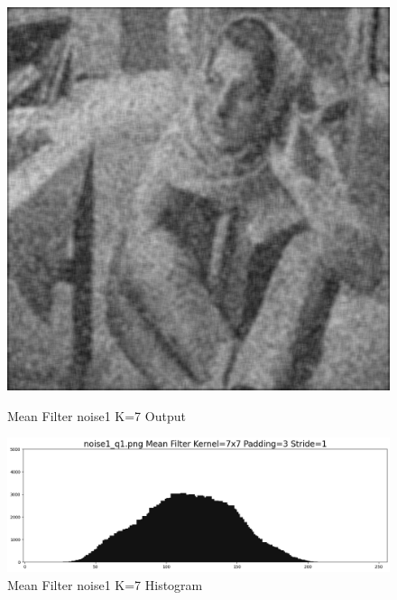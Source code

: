 \documentclass[12pt,a4paper]{report}
\begin{document}
\begin{figure}[!htb]
  \includegraphics[width=1\linewidth]{output/noise1_q1_K7P3.png}
  \caption{Mean Filter noise1 K=7 Output}
  \includegraphics[width=1\linewidth]{output/noise1_q1_K7P3_his.png}
  \caption{Mean Filter noise1 K=7 Histogram}
\end{figure}
\end{document}
